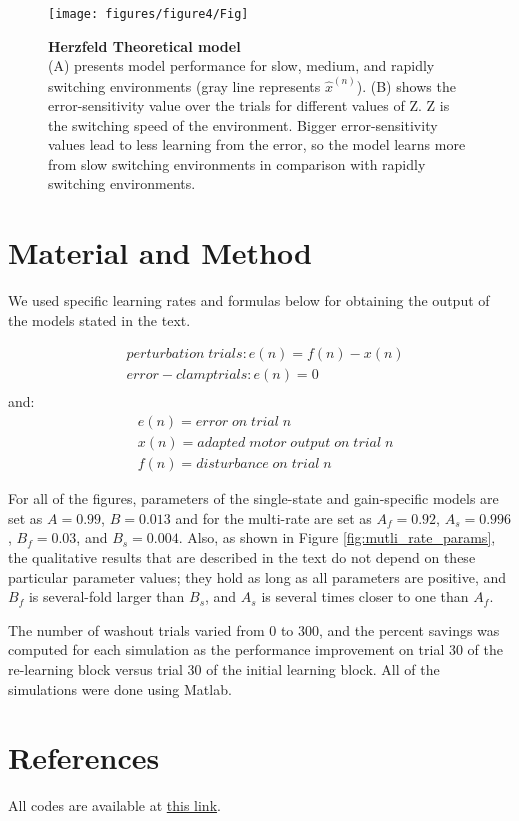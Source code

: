 \documentclass[9pt,twocolumn]{paper-template}
\begin{document}
\begin{figure}[h!]
  \centering
    \texttt{[image: figures/figure4/Fig]}
  \caption{\textbf{Herzfeld Theoretical model}\\
  {(A)} presents model performance for slow, medium, and rapidly switching environments (gray line represents $\hat{x}^{(n)}$). {(B)} shows the error-sensitivity value over the trials for different values of Z. Z is the  switching speed of the environment. Bigger error-sensitivity values lead to less learning from the error, so the model learns more from slow switching environments in comparison with rapidly switching environments.
}
  \label{fig:herzfeld}
\end{figure}





\section*{Material and Method}
We used specific learning rates and formulas below for obtaining the output of the models stated in the text.


\begin{eqnarray*}
& perturbation\;trials : e(n)=f(n)-x(n)\\
& error-clamp trials : e(n) = 0\\
\end{eqnarray*}
and:
\begin{eqnarray*}
& e(n) = error\;on\;trial\;n\\
& x(n) = adapted\;motor\;output\;on\;trial\;n\\
& f(n) = disturbance\;on\;trial\;n
\end{eqnarray*}

For all of the figures, parameters of the single-state and gain-specific models are set as $A=0.99$, $B=0.013$ and for the multi-rate are set as $A_f = 0.92$, $A_s = 0.996$, $B_f = 0.03$, and $B_s = 0.004$. Also, as shown in Figure \ref{fig:mutli_rate_params}, the qualitative results that are described in the text do not depend on these particular parameter values; they hold as long as all parameters are positive, and $B_f$ is several-fold larger than $B_s$, and $A_s$ is several times closer to one than $A_f$.

The number of washout trials varied from 0 to 300, and the percent savings was computed for each simulation as the performance improvement on trial 30 of the re-learning block versus trial 30 of the initial learning block. All of the simulations were done using Matlab.









\section*{References}


\bigskip
\begin{center}
All codes are available at \href{https://github.com/MohammadAminAlamalhoda/Motor-Learning}{this link}.
\end{center}
\end{document}
